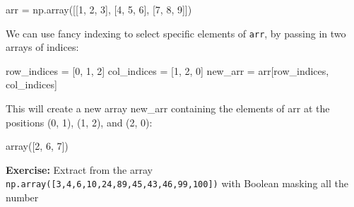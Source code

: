 \documentclass[11pt]{article}
\newenvironment{Shaded}{}{}
\newcommand{\DecValTok}[1]{\textcolor[rgb]{0.25,0.63,0.44}{{#1}}}
\newcommand{\NormalTok}[1]{{#1}}
\newcommand{\OperatorTok}[1]{\textcolor[rgb]{0.40,0.40,0.40}{{#1}}}
\begin{document}
\begin{Shaded}
\begin{Highlighting}[]
\NormalTok{arr }\OperatorTok{=}\NormalTok{ np.array([[}\DecValTok{1}\NormalTok{, }\DecValTok{2}\NormalTok{, }\DecValTok{3}\NormalTok{], [}\DecValTok{4}\NormalTok{, }\DecValTok{5}\NormalTok{, }\DecValTok{6}\NormalTok{], [}\DecValTok{7}\NormalTok{, }\DecValTok{8}\NormalTok{, }\DecValTok{9}\NormalTok{]])}
\end{Highlighting}
\end{Shaded}

We can use fancy indexing to select specific elements of \texttt{arr},
by passing in two arrays of indices:

\begin{Shaded}
\begin{Highlighting}[]
\NormalTok{row\_indices }\OperatorTok{=}\NormalTok{ [}\DecValTok{0}\NormalTok{, }\DecValTok{1}\NormalTok{, }\DecValTok{2}\NormalTok{]}
\NormalTok{col\_indices }\OperatorTok{=}\NormalTok{ [}\DecValTok{1}\NormalTok{, }\DecValTok{2}\NormalTok{, }\DecValTok{0}\NormalTok{]}
\NormalTok{new\_arr }\OperatorTok{=}\NormalTok{ arr[row\_indices, col\_indices]}
\end{Highlighting}
\end{Shaded}

This will create a new array new\_arr containing the elements of arr at
the positions (0, 1), (1, 2), and (2, 0):

\begin{Shaded}
\begin{Highlighting}[]
\NormalTok{array([}\DecValTok{2}\NormalTok{, }\DecValTok{6}\NormalTok{, }\DecValTok{7}\NormalTok{])}
\end{Highlighting}
\end{Shaded}

\textbf{Exercise:} Extract from the array
\texttt{np.array({[}3,4,6,10,24,89,45,43,46,99,100{]})} with Boolean
masking all the number
\end{document}
